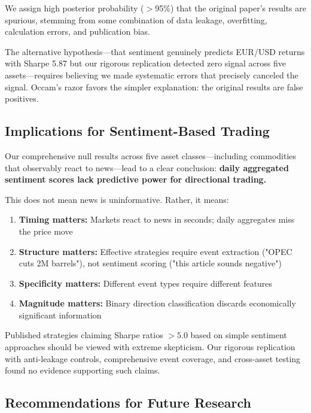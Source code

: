 \documentclass[11pt]{article}
\begin{document}
We assign high posterior probability ($>$95\%) that the original paper's results are spurious, stemming from some combination of data leakage, overfitting, calculation errors, and publication bias.

The alternative hypothesis---that sentiment genuinely predicts EUR/USD returns with Sharpe 5.87 but our rigorous replication detected zero signal across five assets---requires believing we made systematic errors that precisely canceled the signal. Occam's razor favors the simpler explanation: the original results are false positives.

\subsection{Implications for Sentiment-Based Trading}

Our comprehensive null results across five asset classes---including commodities that observably react to news---lead to a clear conclusion: \textbf{daily aggregated sentiment scores lack predictive power for directional trading.}

This does not mean news is uninformative. Rather, it means:

\begin{enumerate}
    \item \textbf{Timing matters:} Markets react to news in seconds; daily aggregates miss the price move
    \item \textbf{Structure matters:} Effective strategies require event extraction ("OPEC cuts 2M barrels"), not sentiment scoring ("this article sounds negative")
    \item \textbf{Specificity matters:} Different event types require different features
    \item \textbf{Magnitude matters:} Binary direction classification discards economically significant information
\end{enumerate}

Published strategies claiming Sharpe ratios $> 5.0$ based on simple sentiment approaches should be viewed with extreme skepticism. Our rigorous replication with anti-leakage controls, comprehensive event coverage, and cross-asset testing found no evidence supporting such claims.

\subsection{Recommendations for Future Research}
\end{document}
